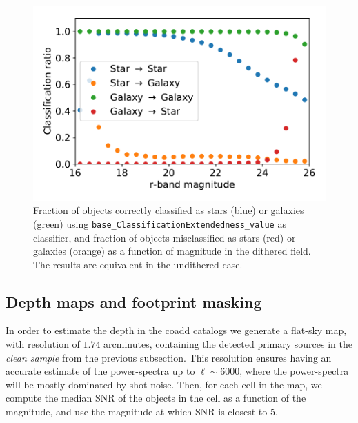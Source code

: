 \documentclass[twocolumn]{aastex62}
\begin{document}
\begin{figure}
\centering
\includegraphics[width=0.9\columnwidth]{stellar_contamination}
\caption{Fraction of objects correctly classified as stars (blue) or galaxies (green) using \texttt{base\_ClassificationExtendedness\_value} as classifier, and fraction of objects misclassified as stars (red) or galaxies (orange) as a function of magnitude in the dithered field. The results are equivalent in the undithered case.}
\label{fig:star_galaxy_separation}
\end{figure}
\subsection{Depth maps and footprint masking}
\label{sec:masking}

In order to estimate the depth in the coadd catalogs we generate a flat-sky map, with resolution of $1.74$ arcminutes, containing the detected primary sources in the \textit{clean sample} from the previous subsection. This resolution ensures having an accurate estimate of the power-spectra up to $\ell \sim 6000$, where the power-spectra will be mostly dominated by shot-noise. Then, for each cell in the map, we compute the median SNR of the objects in the cell as a function of the magnitude, and use the magnitude at which SNR is closest to 5.
\end{document}
